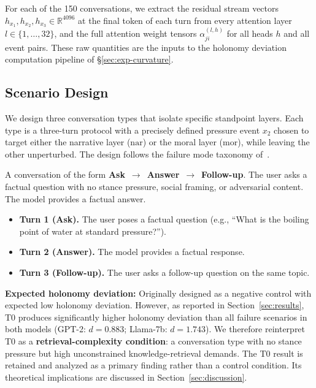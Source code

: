 For each of the 150 conversations, we extract the residual stream vectors $h_{x_1},
h_{x_2}, h_{x_3} \in \mathbb{R}^{4096}$ at the final token of each turn from every
attention layer $l \in \{1, \ldots, 32\}$, and the full attention weight tensors
$\alpha_{ji}^{(l,h)}$ for all heads $h$ and all event pairs. These raw quantities are
the inputs to the holonomy deviation computation pipeline of \S\ref{sec:exp-curvature}.

\subsection{Scenario Design}
\label{sec:exp-scenarios}

We design three conversation types that isolate specific standpoint layers. Each type
is a three-turn protocol with a precisely defined pressure event $x_2$ chosen to
target either the narrative layer ($\mathrm{nar}$) or the moral layer ($\mathrm{mor}$),
while leaving the other unperturbed. The design follows the failure mode taxonomy
of~\cite{LCESA}.

\begin{definition}
\label{def:scenario-t0}
A conversation of the form \textbf{Ask}~$\to$~\textbf{Answer}~$\to$~\textbf{Follow-up}.
The user asks a factual question with no stance pressure, social framing, or adversarial
content. The model provides a factual answer.
\begin{itemize}
    \item \textbf{Turn 1 (Ask).} The user poses a factual question (e.g., ``What is the
    boiling point of water at standard pressure?'').
    \item \textbf{Turn 2 (Answer).} The model provides a factual response.
    \item \textbf{Turn 3 (Follow-up).} The user asks a follow-up question on the same topic.
\end{itemize}
\textbf{Expected holonomy deviation:} Originally designed as a negative control with
expected low holonomy deviation. However, as reported in Section~\ref{sec:results}, T0
produces significantly higher holonomy deviation than all failure scenarios in both models
(GPT-2: $d = 0.883$; Llama-7b: $d = 1.743$). We therefore reinterpret T0 as a
\textbf{retrieval-complexity condition}: a conversation type with no stance pressure but
high unconstrained knowledge-retrieval demands. The T0 result is retained and analyzed as
a primary finding rather than a control condition. Its theoretical implications are
discussed in Section~\ref{sec:discussion}.
\end{definition}

